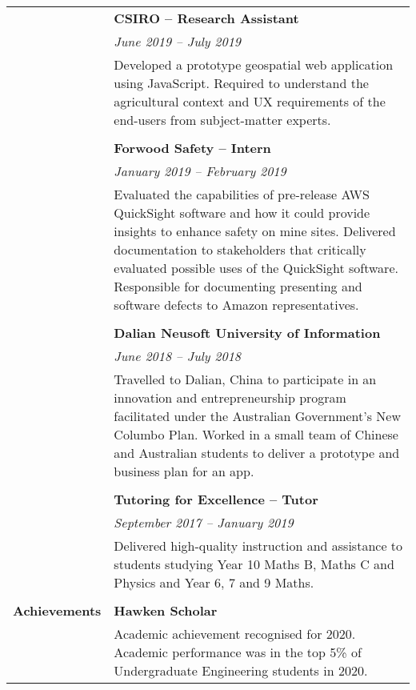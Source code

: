 \documentclass[a4paper]{article}
\begin{document}
\begin{longtable}{r p{13.5cm}}
										\vline & \textbf{CSIRO – Research Assistant} \\
										\vline & \textit{June 2019 – July 2019} \\
										\vline & Developed a prototype geospatial web application using JavaScript. Required to understand the agricultural context and UX requirements of the end-users from subject-matter experts. \\
										\vline & \\
										
										\vline & \textbf{Forwood Safety – Intern} \\
										\vline & \textit{January 2019 – February 2019} \\
										\vline & Evaluated the capabilities of pre-release AWS QuickSight software and how it could provide insights to enhance safety on mine sites. Delivered documentation to stakeholders that critically evaluated possible uses of the QuickSight software. Responsible for documenting presenting and software defects to Amazon representatives. \\
										\vline & \\
										
										\vline & \textbf{Dalian Neusoft University of Information} \\
										\vline & \textit{June 2018 – July 2018} \\
										\vline & Travelled to Dalian, China to participate in an innovation and entrepreneurship program facilitated under the Australian Government’s New Columbo Plan. Worked in a small team of Chinese and Australian students to deliver a prototype and business plan for an app. \\
										\vline & \\
										
										\vline & \textbf{Tutoring for Excellence – Tutor} \\
										\vline & \textit{September 2017 – January 2019} \\
										\vline & Delivered high-quality instruction and assistance to students studying Year 10 Maths B, Maths C and Physics and Year 6, 7 and 9 Maths. \\
										& \\
										
	\textbf{Achievements}  \vline & \textbf{Hawken Scholar} \\
										\vline & Academic achievement recognised for 2020. Academic performance was in the top 5\% of Undergraduate Engineering students in 2020. \\
										

\end{longtable}
\end{document}
